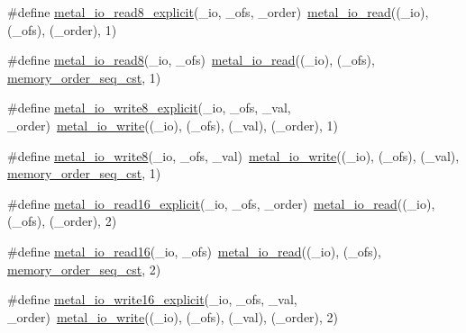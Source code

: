 \begin{DoxyCompactItemize}
\item 
\#define \hyperlink{group__io_ga09f3504dfba6cc039152de19a7a4b5fd}{metal\+\_\+io\+\_\+read8\+\_\+explicit}(\+\_\+io,  \+\_\+ofs,  \+\_\+order)~\hyperlink{group__io_ga0cd8707fcac0d892726f1e946186c531}{metal\+\_\+io\+\_\+read}((\+\_\+io), (\+\_\+ofs), (\+\_\+order), 1)
\item 
\#define \hyperlink{group__io_gad36635d9a8e5bb64cd4ecf2b8027f38f}{metal\+\_\+io\+\_\+read8}(\+\_\+io,  \+\_\+ofs)~\hyperlink{group__io_ga0cd8707fcac0d892726f1e946186c531}{metal\+\_\+io\+\_\+read}((\+\_\+io), (\+\_\+ofs), \hyperlink{compiler_2gcc_2atomic_8h_a17c2de5ae768960284c047a320f17d1ba2d21914d1edd227a890107e7878a3752}{memory\+\_\+order\+\_\+seq\+\_\+cst}, 1)
\item 
\#define \hyperlink{group__io_gaa30723c231c8cbfa52b784a34e449646}{metal\+\_\+io\+\_\+write8\+\_\+explicit}(\+\_\+io,  \+\_\+ofs,  \+\_\+val,  \+\_\+order)~\hyperlink{group__io_ga74ef56cd9b16bced8c2b8553956220b4}{metal\+\_\+io\+\_\+write}((\+\_\+io), (\+\_\+ofs), (\+\_\+val), (\+\_\+order), 1)
\item 
\#define \hyperlink{group__io_ga6f3f1fad31b9a01994df68237ccf4a9c}{metal\+\_\+io\+\_\+write8}(\+\_\+io,  \+\_\+ofs,  \+\_\+val)~\hyperlink{group__io_ga74ef56cd9b16bced8c2b8553956220b4}{metal\+\_\+io\+\_\+write}((\+\_\+io), (\+\_\+ofs), (\+\_\+val), \hyperlink{compiler_2gcc_2atomic_8h_a17c2de5ae768960284c047a320f17d1ba2d21914d1edd227a890107e7878a3752}{memory\+\_\+order\+\_\+seq\+\_\+cst}, 1)
\item 
\#define \hyperlink{group__io_ga8a63cac7c3fd2277985d23e3f07783a4}{metal\+\_\+io\+\_\+read16\+\_\+explicit}(\+\_\+io,  \+\_\+ofs,  \+\_\+order)~\hyperlink{group__io_ga0cd8707fcac0d892726f1e946186c531}{metal\+\_\+io\+\_\+read}((\+\_\+io), (\+\_\+ofs), (\+\_\+order), 2)
\item 
\#define \hyperlink{group__io_ga3699112c48162e0f30624f4952ef8b7a}{metal\+\_\+io\+\_\+read16}(\+\_\+io,  \+\_\+ofs)~\hyperlink{group__io_ga0cd8707fcac0d892726f1e946186c531}{metal\+\_\+io\+\_\+read}((\+\_\+io), (\+\_\+ofs), \hyperlink{compiler_2gcc_2atomic_8h_a17c2de5ae768960284c047a320f17d1ba2d21914d1edd227a890107e7878a3752}{memory\+\_\+order\+\_\+seq\+\_\+cst}, 2)
\item 
\#define \hyperlink{group__io_ga57b9502dd632058ede3394c9910a144f}{metal\+\_\+io\+\_\+write16\+\_\+explicit}(\+\_\+io,  \+\_\+ofs,  \+\_\+val,  \+\_\+order)~\hyperlink{group__io_ga74ef56cd9b16bced8c2b8553956220b4}{metal\+\_\+io\+\_\+write}((\+\_\+io), (\+\_\+ofs), (\+\_\+val), (\+\_\+order), 2)

\end{DoxyCompactItemize}
